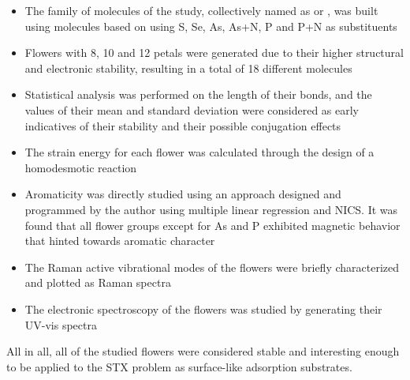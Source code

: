 \begin{itemize}
    \item The family of molecules of the study, collectively named as  or , was built using molecules based on  using S, Se, As, As+N, P and P+N as substituents
    \item Flowers with 8, 10 and 12 petals were generated due to their higher structural and electronic stability, resulting in a total of 18 different molecules
    \item Statistical analysis was performed on the length of their bonds, and the values of their mean and standard deviation were considered as early indicatives of their stability and their possible conjugation effects
    \item The strain energy for each flower was calculated through the design of a homodesmotic reaction
    \item Aromaticity was directly studied using an approach designed and programmed by the author using multiple linear regression and NICS. It was found that all flower groups except for As and P exhibited magnetic behavior that hinted towards aromatic character
    \item The Raman active vibrational modes of the flowers were briefly characterized and plotted as Raman spectra
    \item The electronic spectroscopy of the flowers was studied by generating their UV-vis spectra
\end{itemize}

All in all, all of the studied flowers were considered stable and interesting enough to be applied to the STX problem as surface-like adsorption substrates.
